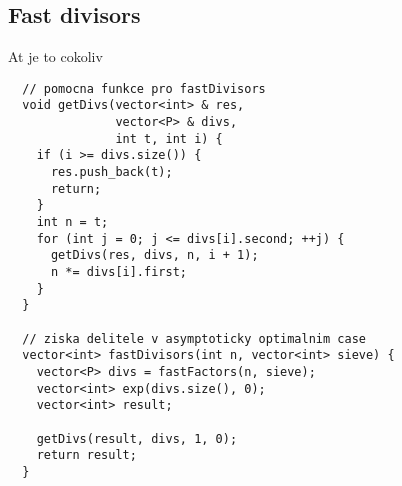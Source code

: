 \documentclass{article}
\begin{document}
\subsection{Fast divisors}
At je to cokoliv

\begin{lstlisting}
  // pomocna funkce pro fastDivisors
  void getDivs(vector<int> & res, 
               vector<P> & divs,
               int t, int i) {
    if (i >= divs.size()) {
      res.push_back(t);
      return;
    }
    int n = t;
    for (int j = 0; j <= divs[i].second; ++j) {
      getDivs(res, divs, n, i + 1);
      n *= divs[i].first;
    }
  }

  // ziska delitele v asymptoticky optimalnim case
  vector<int> fastDivisors(int n, vector<int> sieve) {
    vector<P> divs = fastFactors(n, sieve);
    vector<int> exp(divs.size(), 0);
    vector<int> result;

    getDivs(result, divs, 1, 0);
    return result;
  }
\end{lstlisting}
\end{document}
